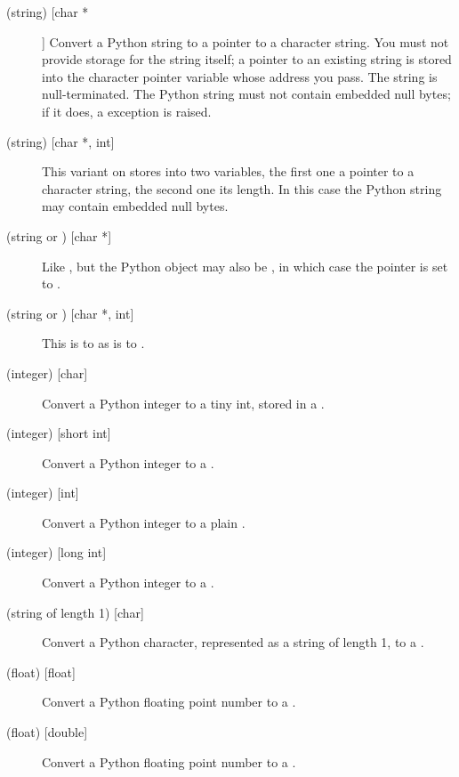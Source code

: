 \documentclass[twoside,openright]{report}
\begin{document}
\begin{description}

\item[ (string) [char *]]
Convert a Python string to a \C{} pointer to a character string.  You
must not provide storage for the string itself; a pointer to an
existing string is stored into the character pointer variable whose
address you pass.  The \C{} string is null-terminated.  The Python string
must not contain embedded null bytes; if it does, a 
exception is raised.

\item[ (string) {[char *, int]}]
This variant on  stores into two \C{} variables, the first one
a pointer to a character string, the second one its length.  In this
case the Python string may contain embedded null bytes.

\item[ (string or ) {[char *]}]
Like , but the Python object may also be , in which
case the \C{} pointer is set to \NULL{}.

\item[ (string or ) {[char *, int]}]
This is to  as  is to .

\item[ (integer) {[char]}]
Convert a Python integer to a tiny int, stored in a \C{} .

\item[ (integer) {[short int]}]
Convert a Python integer to a \C{} .

\item[ (integer) {[int]}]
Convert a Python integer to a plain \C{} .

\item[ (integer) {[long int]}]
Convert a Python integer to a \C{} .

\item[ (string of length 1) {[char]}]
Convert a Python character, represented as a string of length 1, to a
\C{} .

\item[ (float) {[float]}]
Convert a Python floating point number to a \C{} .

\item[ (float) {[double]}]
Convert a Python floating point number to a \C{} .


\end{description}
\end{document}
